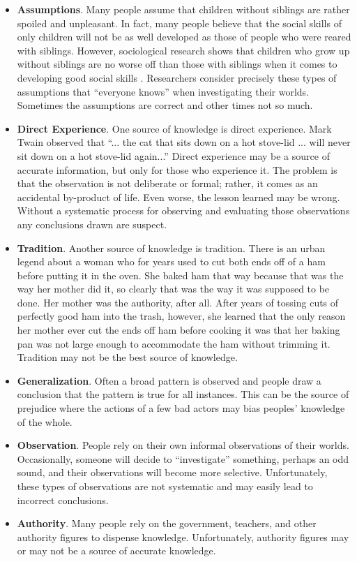 \begin{itemize}
	\item \textbf{Assumptions}. Many people assume that children without siblings are rather spoiled and unpleasant. In fact, many people believe that the social skills of only children will not be as well developed as those of people who were reared with siblings. However, sociological research shows that children who grow up without siblings are no worse off than those with siblings when it comes to developing good social skills \cite{bobbitt2013number}. Researchers consider precisely these types of assumptions that ``everyone knows'' when investigating their worlds. Sometimes the assumptions are correct and other times not so much.
	
	\item \textbf{Direct Experience}. One source of knowledge is direct experience. Mark Twain observed that ``... the cat that sits down on a hot stove-lid ... will never sit down on a hot stove-lid again...'' \cite{twain2014following} Direct experience may be a source of accurate information, but only for those who experience it. The problem is that the observation is not deliberate or formal; rather, it comes as an accidental by-product of life. Even worse, the lesson learned may be wrong. Without a systematic process for observing and evaluating those observations any conclusions drawn are suspect.

	\item \textbf{Tradition}. Another source of knowledge is tradition. There is an urban legend about a woman who for years used to cut both ends off of a ham before putting it in the oven\cite{snopes2005grandma}. She baked ham that way because that was the way her mother did it, so clearly that was the way it was supposed to be done. Her mother was the authority, after all. After years of tossing cuts of perfectly good ham into the trash, however, she learned that the only reason her mother ever cut the ends off ham before cooking it was that her baking pan was not large enough to accommodate the ham without trimming it. Tradition may not be the best source of knowledge.

	\item \textbf{Generalization}. Often a broad pattern is observed and people draw a conclusion that the pattern is true for all instances. This can be the source of prejudice where the actions of a few bad actors may bias peoples' knowledge of the whole.

	\item \textbf{Observation}. People rely on their own informal observations of their worlds. Occasionally, someone will decide to ``investigate'' something, perhaps an odd sound, and their observations will become more selective. Unfortunately, these types of observations are not systematic and may easily lead to incorrect conclusions.
			
	\item \textbf{Authority}. Many people rely on the government, teachers, and other authority figures to dispense knowledge. Unfortunately, authority figures may or may not be a source of accurate knowledge.
	
\end{itemize} 

